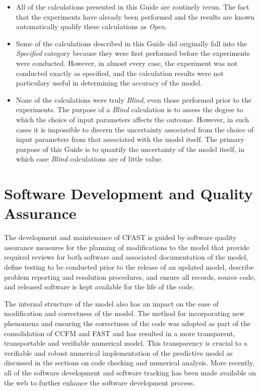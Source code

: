 \begin{itemize}
\item All of the calculations presented in this Guide are routinely rerun. The
fact that the experiments have already been performed and the results are known automatically qualify these
calculations as {\em Open}.
\item Some of the calculations described in this Guide did originally fall into the {\em Specified} category because they
were first performed before the experiments were conducted. However, in almost every case, the experiment was not conducted
exactly as specified, and the calculation results were not particulary useful in determining the accuracy of the model.
\item None of the calculations were truly {\em Blind}, even those performed prior to the experiments. The purpose of a
{\em Blind} calculation is to assess the degree to which the choice of input parameters affects the outcome. However,
in such cases it is impossible to discern the uncertainty associated from the choice of input parameters from that associated
with the model itself. The primary purpose of this Guide is to quantify the uncertainty of the model itself, in which
case {\em Blind} calculations are of little value.
\end{itemize}


\section{Software Development and Quality Assurance}

The development and maintenance of CFAST is guided by software quality assurance measures for the planning of modifications to the model that provide required reviews for both software and associated documentation of the model, define testing to be conducted prior to the release of an updated model, describe problem reporting and resolution procedures, and ensure all records, source code, and released software is kept available for the life of the code.  

The internal structure of the model also has an impact on the ease of modification and correctness of the model.  The method for incorporating new phenomena and ensuring the correctness of the code was adopted as part of the consolidation of CCFM and FAST and has resulted in a more transparent, transportable and verifiable numerical model. This transparency is crucial to a verifiable and robust numerical implementation of the predictive model as discussed in the sections on code checking and numerical analysis.  More recently, all of the software development and software tracking has been made available on the web to further enhance the software development process.

